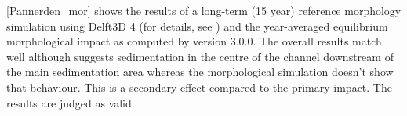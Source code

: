 \autoref{Pannerden_mor} shows the results of a long-term (15 year) reference morphology simulation using Delft3D 4 (for details, see \citet{GiriJagers2022}) and the year-averaged equilibrium morphological impact as computed by \dfmi version 3.0.0.
The overall results match well although \dfmi suggests sedimentation in the centre of the channel downstream of the main sedimentation area whereas the morphological simulation doesn't show that behaviour.
This is a secondary effect compared to the primary impact.
The results are judged as valid.